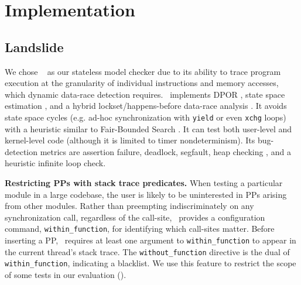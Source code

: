 \section{Implementation}
\label{sec:implementation}

\subsection{Landslide}
\label{sec:landslide}

We chose \landslide~\cite{landslide} as our stateless model checker due to its ability to trace program execution at the granularity of individual instructions and memory accesses, which dynamic data-race detection requires.
\landslide~implements DPOR \cite{dpor},
state space estimation \cite{estimation}, and a hybrid lockset/happens-before data-race analysis \cite{hybriddatarace}.
It avoids state space cycles (e.g. ad-hoc synchronization with {\tt yield} or even {\tt xchg} loops) with a heuristic similar to Fair-Bounded Search \cite{bpor}.
It can test both user-level and kernel-level code (although it is limited to timer nondeterminism).
Its bug-detection metrics are assertion failure, deadlock, segfault, heap checking \cite{valgrind}, and a heuristic infinite loop check.

{\bf Restricting PPs with stack trace predicates.}
When testing a particular module in a large codebase,
the user is likely to be uninterested in PPs arising from other modules.
Rather than preempting indiscriminately on any synchronization call, regardless of the call-site,
\landslide~provides a configuration command, {\tt within\_function}, for identifying which call-sites matter.
Before inserting a PP, \landslide~requires at least one argument to {\tt within\_function} to appear in the current thread's stack trace.
The {\tt without\_\allowbreak{}function} directive is the dual of {\tt within\_function}, indicating a blacklist.
We use this feature to restrict the scope of some tests in our evaluation (\sect{\ref{sec:testsuite}}).

